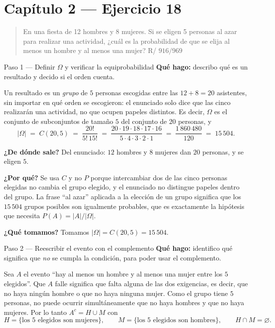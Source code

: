 \documentclass[11pt]{article}
\begin{document}
\section*{Cap\'itulo 2 --- Ejercicio 18}

\begin{quote}
En una fiesta de 12 hombres y 8 mujeres. Si se eligen 5 personas al azar para realizar una actividad, ¿cu\'al es la probabilidad de que se elija al menos un hombre y al menos una mujer? \hfill R/ $916/969$
\end{quote}

\begin{sol}

\begin{paso}{Paso 1 --- Definir $\Omega$ y verificar la equiprobabilidad}
\textbf{Qu\'e hago:} describo qu\'e es un resultado y decido si el orden cuenta.

Un resultado es un \emph{grupo} de $5$ personas escogidas entre las $12+8=20$ asistentes, sin importar en qu\'e orden se escogieron: el enunciado solo dice que las cinco realizar\'an una actividad, no que ocupen papeles distintos. Es decir, $\Omega$ es el conjunto de subconjuntos de tama\~no $5$ del conjunto de $20$ personas, y
\[
|\Omega| \;=\; C(20,5) \;=\; \frac{20!}{5!\,15!}
\;=\;\frac{20\cdot 19\cdot 18\cdot 17\cdot 16}{5\cdot 4\cdot 3\cdot 2\cdot 1}
\;=\;\frac{1\,860\,480}{120}\;=\;15\,504 .
\]

\textbf{¿De d\'onde sale?} Del enunciado: $12$ hombres y $8$ mujeres dan $20$ personas, y se eligen $5$.

\textbf{¿Por qu\'e?} Se usa $C$ y no $P$ porque intercambiar dos de las cinco personas elegidas no cambia el grupo elegido, y el enunciado no distingue papeles dentro del grupo. La frase ``al azar'' aplicada a la elecci\'on de un grupo significa que los $15\,504$ grupos posibles son igualmente probables, que es exactamente la hip\'otesis que necesita $P(A)=|A|/|\Omega|$.

\textbf{¿Qu\'e tomamos?} Tomamos $|\Omega|=C(20,5)=15\,504$.
\end{paso}

\begin{paso}{Paso 2 --- Reescribir el evento con el complemento}
\textbf{Qu\'e hago:} identifico qu\'e significa que \emph{no} se cumpla la condici\'on, para poder usar el complemento.

Sea $A$ el evento ``hay al menos un hombre y al menos una mujer entre los $5$ elegidos''. Que $A$ falle significa que falta alguna de las dos exigencias, es decir, que no haya ning\'un hombre o que no haya ninguna mujer. Como el grupo tiene $5$ personas, no puede ocurrir simult\'aneamente que no haya hombres y que no haya mujeres. Por lo tanto $A^{c}=H\cup M$ con
\[
H=\{\text{los 5 elegidos son mujeres}\},\qquad M=\{\text{los 5 elegidos son hombres}\},\qquad H\cap M=\varnothing .
\]


\end{paso}
\end{sol}
\end{document}
